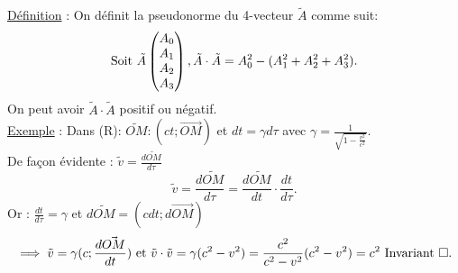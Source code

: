 \documentclass{article}
\begin{document}
\underline{Définition} : On définit la pseudonorme du 4-vecteur $\tilde{A}$ comme suit:
\[
\text{Soit } \tilde{A}\begin{pmatrix} A_0\\A_1\\A_2\\A_3 \end{pmatrix}, \space  \tilde{A} \cdot \tilde{A} = A_0^2 -(A_1^2 +A_2^2 +A_3^2)    
.\] 
On peut avoir $\tilde{A} \cdot \tilde{A}$ positif ou négatif. \\
\underline{Exemple} : Dans (R): $\tilde{OM} : (ct;\vec{OM})$ et $dt = \gamma d\tau$ avec $\gamma = \frac{1}{\sqrt{1-\frac{v^2}{c^2}} }$.\\
De façon évidente : $\tilde{v} = \frac{d\tilde{OM}}{d\tau}$\\
\[
\tilde{v} = \frac{d\tilde{OM}}{d\tau} = \frac{d\tilde{OM}}{dt} \cdot \frac{dt}{d\tau}
.\] 
Or : $\frac{dt}{d\tau} = \gamma $ et $d\tilde{OM} = (cdt;d\vec{OM})$
\[
\implies \tilde{v} = \gamma (c\space;\frac{d\vec{OM}}{dt}) \text{ et } \tilde{v} \cdot \tilde{v} = \gamma (c^2 -v^2) = \frac{c^2 }{c^2 -v^2 } (c^2 -v^2) = c^2 \text{ Invariant } \square 
.\] 
\end{document}
